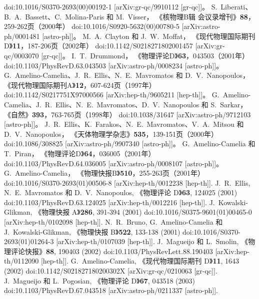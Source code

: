 \documentclass[jkps,preprint,fleqn]{revtex4}
\begin{document}
\begin{CJK*}{UTF8}{gbsn}
\begin{thebibliography}{999}
doi:10.1016/S0370-2693(00)00192-1
[arXiv:gr-qc/9910112 [gr-qc]]。
S.~Liberati、B.~A.~Bassett、C.~Molina-Paris 和 M.~Visser，
《核物理B辑 会议录增刊》\textbf{88}，259-262页（2000年）
doi:10.1016/S0920-5632(00)00780-5
[arXiv:astro-ph/0001481 [astro-ph]]。
M.~A.~Clayton 和 J.~W.~Moffat，
《现代物理国际期刊D》\textbf{11}，187-206页（2002年）
doi:10.1142/S0218271802001457
[arXiv:gr-qc/0003070 [gr-qc]]。
I.~T.~Drummond，
《物理评论D》\textbf{63}，043503（2001年）
doi:10.1103/PhysRevD.63.043503
[arXiv:astro-ph/0008234 [astro-ph]]。
G.~Amelino-Camelia、J.~R.~Ellis、N.~E.~Mavromatos 和 D.~V.~Nanopoulos，
《现代物理国际期刊A》\textbf{12}，607-624页（1997年）
doi:10.1142/S0217751X97000566
[arXiv:hep-th/9605211 [hep-th]]。
G.~Amelino-Camelia、J.~R.~Ellis、N.~E.~Mavromatos、D.~V.~Nanopoulos 和 S.~Sarkar，
《自然》\textbf{393}，763-765页（1998年）
doi:10.1038/31647
[arXiv:astro-ph/9712103 [astro-ph]]。
J.~R.~Ellis、K.~Farakos、N.~E.~Mavromatos、V.~A.~Mitsou 和 D.~V.~Nanopoulos，
《天体物理学杂志》\textbf{535}，139-151页（2000年）
doi:10.1086/308825
[arXiv:astro-ph/9907340 [astro-ph]]。
G.~Amelino-Camelia 和 T.~Piran，
《物理评论D》\textbf{64}，036005（2001年）
doi:10.1103/PhysRevD.64.036005
[arXiv:astro-ph/0008107 [astro-ph]]。
G.~Amelino-Camelia，
《物理快报B》\textbf{510}，255-263页（2001年）
doi:10.1016/S0370-2693(01)00506-8
[arXiv:hep-th/0012238 [hep-th]].
J.~R.~Ellis, N.~E.~Mavromatos 和 D.~V.~Nanopoulos,
《物理评论 D》\textbf{63}, 124025 (2001)
doi:10.1103/PhysRevD.63.124025
[arXiv:hep-th/0012216 [hep-th]].
J.~Kowalski-Glikman,
《物理快报 A》\textbf{286}, 391-394 (2001)
doi:10.1016/S0375-9601(01)00465-0
[arXiv:hep-th/0102098 [hep-th]].
N.~R.~Bruno, G.~Amelino-Camelia 和 J.~Kowalski-Glikman,
《物理快报 B》\textbf{522}, 133-138 (2001)
doi:10.1016/S0370-2693(01)01264-3
[arXiv:hep-th/0107039 [hep-th]].
J.~Magueijo 和 L.~Smolin,
《物理评论快报》\textbf{88}, 190403 (2002)
doi:10.1103/PhysRevLett.88.190403
[arXiv:hep-th/0112090 [hep-th]].
G.~Amelino-Camelia,
《现代物理国际期刊 D》\textbf{11}, 1643 (2002)
doi:10.1142/S021827180200302X
[arXiv:gr-qc/0210063 [gr-qc]].
J.~Magueijo 和 L.~Pogosian,
《物理评论 D》\textbf{67}, 043518 (2003)
doi:10.1103/PhysRevD.67.043518
[arXiv:astro-ph/0211337 [astro-ph]].

\end{thebibliography}
\end{CJK*}
\end{document}
